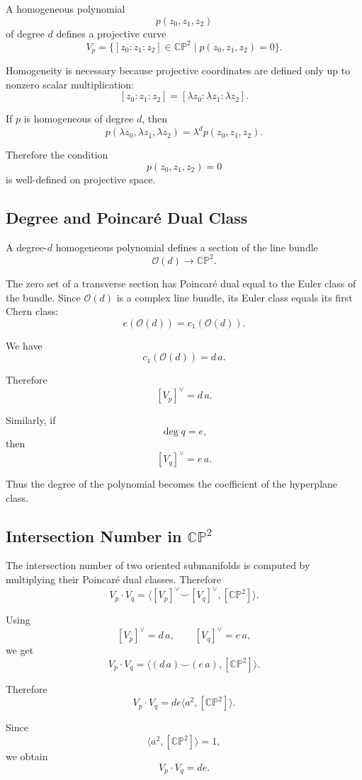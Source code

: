 \documentclass[12pt,a4paper]{article}
\theoremstyle{notespace}
\begin{document}
A homogeneous polynomial
\[
p(z_0,z_1,z_2)
\]
of degree \(d\) defines a projective curve
\[
V_p
=
\{[z_0:z_1:z_2]\in \mathbb{CP}^2
\mid
p(z_0,z_1,z_2)=0\}.
\]

Homogeneity is necessary because projective coordinates are defined only up to
nonzero scalar multiplication:
\[
[z_0:z_1:z_2]=[\lambda z_0:\lambda z_1:\lambda z_2].
\]

If \(p\) is homogeneous of degree \(d\), then
\[
p(\lambda z_0,\lambda z_1,\lambda z_2)
=
\lambda^d p(z_0,z_1,z_2).
\]

Therefore the condition
\[
p(z_0,z_1,z_2)=0
\]
is well-defined on projective space.

\subsection{Degree and Poincar\'e Dual Class}

A degree-\(d\) homogeneous polynomial defines a section of the line bundle
\[
\mathcal O(d)\to \mathbb{CP}^2.
\]

The zero set of a transverse section has Poincar\'e dual equal to the Euler class
of the bundle. Since \(\mathcal O(d)\) is a complex line bundle, its Euler class
equals its first Chern class:
\[
e(\mathcal O(d))=c_1(\mathcal O(d)).
\]

We have
\[
c_1(\mathcal O(d))=d\,a.
\]

Therefore
\[
[V_p]^\vee=d\,a.
\]

Similarly, if
\[
\deg q=e,
\]
then
\[
[V_q]^\vee=e\,a.
\]

Thus the degree of the polynomial becomes the coefficient of the hyperplane
class.

\subsection{Intersection Number in \(\mathbb{CP}^2\)}

The intersection number of two oriented submanifolds is computed by multiplying
their Poincar\'e dual classes. Therefore
\[
V_p\cdot V_q
=
\langle [V_p]^\vee\smile [V_q]^\vee,[\mathbb{CP}^2]\rangle.
\]

Using
\[
[V_p]^\vee=d\,a,
\qquad
[V_q]^\vee=e\,a,
\]
we get
\[
V_p\cdot V_q
=
\langle (d\,a)\smile(e\,a),[\mathbb{CP}^2]\rangle.
\]

Therefore
\[
V_p\cdot V_q
=
de\langle a^2,[\mathbb{CP}^2]\rangle.
\]

Since
\[
\langle a^2,[\mathbb{CP}^2]\rangle=1,
\]
we obtain
\[
V_p\cdot V_q=de.
\]
\end{document}
